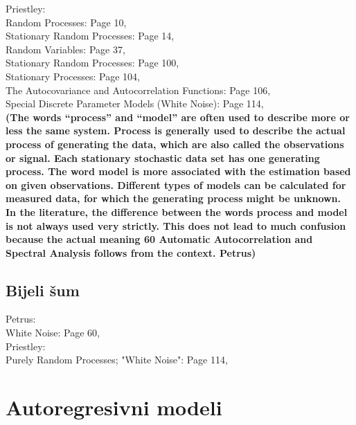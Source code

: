 \documentclass[a4paper,12pt,oneside]{memoir}
\begin{document}
            Priestley:\\
            Random Processes: Page 10,\\
            Stationary Random Processes: Page 14,\\
            Random Variables: Page 37,\\
            Stationary Random Processes: Page 100,\\
            Stationary Processes: Page 104,\\
            The Autocovariance and Autocorrelation Functions: Page 106,\\
            Special Discrete Parameter Models (White Noise): Page 114,\\

            \textbf{(The words “process” and “model” are often used to describe more or less the same
            system. Process is generally used to describe the actual process of generating the
            data, which are also called the observations or signal. Each stationary stochastic
            data set has one generating process. The word model is more associated with the
            estimation based on given observations. Different types of models can be calculated
            for measured data, for which the generating process might be unknown. In the
            literature, the difference between the words process and model is not always used
            very strictly. This does not lead to much confusion because the actual meaning
            60 Automatic Autocorrelation and Spectral Analysis
            follows from the context. Petrus)}
   
    
        
        \section{Bijeli šum}
                Petrus:\\
                    White Noise: Page 60,\\

                Priestley:\\
                    Purely Random Processes; "White Noise": Page 114,\\

    \chapter{Autoregresivni modeli}
            
\end{document}
